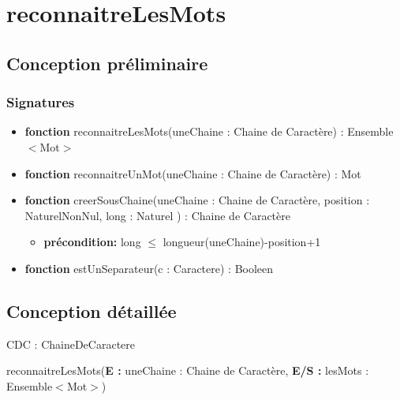 \documentclass{article}
\begin{document}
    \pagestyle{empty}
    \noindent

    \section*{reconnaitreLesMots}
    \subsection*{Conception préliminaire}
    
    \subsubsection*{Signatures}

	\begin{itemize}[label=$\ $, leftmargin=1cm]
		 \item \textbf{fonction} reconnaitreLesMots(uneChaine : Chaine de Caractère) : Ensemble$<$Mot$>$
		 \item \textbf{fonction} reconnaitreUnMot(uneChaine : Chaine de Caractère) : Mot
		 \item \textbf{fonction} creerSousChaine(uneChaine : Chaine de Caractère, position : NaturelNonNul, long : Naturel ) : Chaine de Caractère
		 \begin{itemize}[label=$| $]
            \item \textbf{précondition:} long $\le$ longueur(uneChaine)-position+1
         \end{itemize}
         \item \textbf{fonction} estUnSeparateur(c : Caractere) : Booleen
		 
	\end{itemize} 

    \subsection*{Conception détaillée}

	CDC : ChaineDeCaractere
        
    \begin{procedure}
        \SetAlgoLined
        \caption{reconnaitreLesMots(\textbf{E :} uneChaine : Chaine de Caractère, \textbf{E/S :} lesMots : Ensemble$<$Mot$>$) }
    \end{procedure}
    
\end{document}
